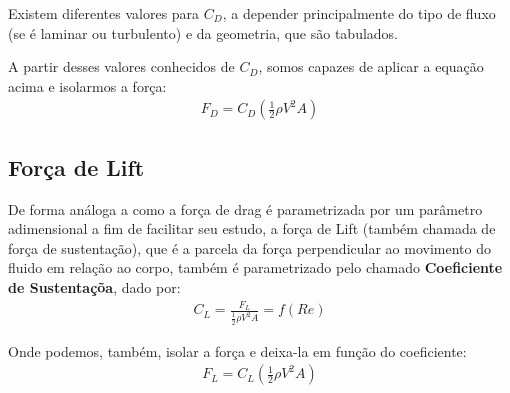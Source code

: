 \documentclass{article}
\begin{document}
Existem diferentes valores para $C_D$, a depender principalmente do tipo de fluxo (se é laminar ou turbulento) e da geometria, que são tabulados.

A partir desses valores conhecidos de $C_D$, somos capazes de aplicar a equação acima e isolarmos a força:
\begin{align}
    F_D = C_D \left(\frac{1}{2} \rho V^2 A\right)
\end{align}

\subsection{Força de Lift}

De forma análoga a como a força de drag é parametrizada por um parâmetro adimensional a fim de facilitar seu estudo, a força de Lift (também chamada de força de sustentação), que é a parcela da força perpendicular ao movimento do fluido em relação ao corpo,
também é parametrizado pelo chamado \textbf{Coeficiente de Sustentaçõa}, dado por:
\begin{align}
    C_L = \frac{F_L}{\frac{1}{2}\rho V^2 A} = f(Re)
\end{align}

Onde podemos, também, isolar a força e deixa-la em função do coeficiente:
\begin{align}
    F_L = C_L \left(\frac{1}{2} \rho V^2 A\right)
\end{align}
\end{document}
